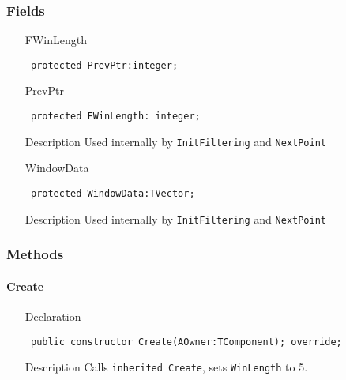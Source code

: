 \documentclass[12pt,a4paper,oneside]{report}
\newcommand{\declarationitem}[1]{{\addfontfeatures{FakeSlant} #1}}
\newcommand{\descriptiontitle}[1]{{\addfontfeatures{FakeSlant}#1}}
\newcommand{\inlineitem}[1]{{\addfontfeatures{FakeBold} #1}}
\newcommand{\code}[1]{\texttt{#1}}
\begin{document}
\subsubsection{Fields}
\begin{itemize}\label{lmfilters.TFIRFilter-FWinLength}
	\item[\inlineitem{FWinLength}\hfill]
	\begin{flushleft}
		\code{
			protected PrevPtr:integer;}
	\end{flushleft}
\end{itemize}
\begin{itemize}\label{lmfilters.TFIRFilter-PrevPtr}
	\item[\inlineitem{PrevPtr}\hfill]
	\begin{flushleft}
		\code{
			protected FWinLength: integer;}
	\end{flushleft}
	\item[\descriptiontitle{Description}] Used internally by \code{InitFiltering} and \code{NextPoint}
\end{itemize}
\begin{itemize}\label{lmfilters.TFIRFilter-WindowData}
	\item[\inlineitem{WindowData}\hfill]
	\begin{flushleft}
		\code{
			protected WindowData:TVector;}
	\end{flushleft}
	\item[\descriptiontitle{Description}] Used internally by \code{InitFiltering} and \code{NextPoint}
\end{itemize}
\subsubsection{Methods}
\paragraph{Create}\hspace*{\fill}
\label{lmfilters.TFIRFilter-Create}
\begin{itemize}\item[\declarationitem{Declaration}\hfill]
	\begin{flushleft}
		\code{
			public constructor Create(AOwner:TComponent); override;}
	\end{flushleft}
	\item[\descriptiontitle{Description}] Calls \code{inherited Create}, sets \code{WinLength} to 5.
\end{itemize}
\end{document}
